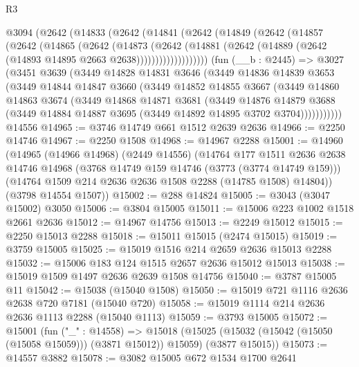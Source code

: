 \begin{lexlean}{R3}
\begin{coremodule}
    @3094
      (@2642
        (@14833
          (@2642
            (@14841
              (@2642
                (@14849
                  (@2642
                    (@14857
                      (@2642
                        (@14865
                          (@2642
                            (@14873
                              (@2642
                                (@14881
                                  (@2642
                                    (@14889 (@2642 (@14893 @14895 @2663 @2638)))))))))))))))))))
    (fun (__b : @2445) =>
    @3027
      (@3451
        @3639
        (@3449
          @14828
          @14831
          @3646
          (@3449
            @14836
            @14839
            @3653
            (@3449
              @14844
              @14847
              @3660
              (@3449
                @14852
                @14855
                @3667
                (@3449
                  @14860
                  @14863
                  @3674
                  (@3449
                    @14868
                    @14871
                    @3681
                    (@3449
                      @14876
                      @14879
                      @3688
                      (@3449 @14884 @14887 @3695 (@3449 @14892 @14895 @3702 @3704)))))))))))
    @14556
@14965 := @3746 @14749 @661 @1512 @2639 @2636
@14966 := @2250 @14746
@14967 := @2250 @1508
@14968 := @14967 @2288
@15001 := @14960
    (@14965
      (@14966 @14968)
      (@2449 @14556)
      (@14764
        @177
        @1511
        @2636
        @2638
        @14746
        @14968
        (@3768 @14749 @159 @14746 (@3773 (@3774 @14749 @159)))
        (@14764 @1509 @214 @2636 @2636 @1508 @2288 (@14785 @1508) @14804))
      (@3798 @14554 @1507))
@15002 := @288 @14824
@15005 := @3043 (@3047 @15002) @3050
@15006 := @3804 @15005
@15011 := @15006 @223 @1002 @1518 @2661 @2636
@15012 := @14967 @14756
@15013 := @2249 @15012
@15015 := @2250 @15013 @2288
@15018 := @15011 @15015 (@2474 @15015)
@15019 := @3759 @15005
@15025 := @15019 @1516 @214 @2659 @2636 @15013 @2288
@15032 := @15006 @183 @124 @1515 @2657 @2636 @15012 @15013
@15038 := @15019 @1509 @1497 @2636 @2639 @1508 @14756
@15040 := @3787 @15005 @11
@15042 := @15038 (@15040 @1508)
@15050 := @15019 @721 @1116 @2636 @2638 @720 @7181 (@15040 @720)
@15058 := @15019 @1114 @214 @2636 @2636 @1113 @2288 (@15040 @1113)
@15059 := @3793 @15005
@15072 := @15001
    (fun ("_" : @14558) =>
    @15018 (@15025 (@15032 (@15042 (@15050 (@15058 @15059))) (@3871 @15012)) @15059) (@3877 @15015))
@15073 := @14557 @3882
@15078 := @3082 @15005 @672 @1534 @1700 @2641

\end{coremodule}
\end{lexlean}
